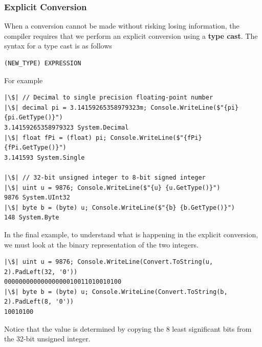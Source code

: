 \documentclass{article}
\begin{document}
\subsubsection{Explicit Conversion}
When a conversion cannot be made without risking losing information,
the compiler requires that we perform an explicit conversion using a
\textbf{type cast}. The syntax for a type cast is as follows
\begin{verbatim}
(NEW_TYPE) EXPRESSION
\end{verbatim}
For example
\begin{verbatim}
|\$| // Decimal to single precision floating-point number
|\$| decimal pi = 3.14159265358979323m; Console.WriteLine($"{pi} {pi.GetType()}")
3.14159265358979323 System.Decimal
|\$| float fPi = (float) pi; Console.WriteLine($"{fPi} {fPi.GetType()}")
3.141593 System.Single

|\$| // 32-bit unsigned integer to 8-bit signed integer
|\$| uint u = 9876; Console.WriteLine($"{u} {u.GetType()}")
9876 System.UInt32
|\$| byte b = (byte) u; Console.WriteLine($"{b} {b.GetType()}")
148 System.Byte
\end{verbatim}
In the final example, to understand what is happening in the explicit
conversion, we must look at the binary representation of the two
integers.
\begin{verbatim}
|\$| uint u = 9876; Console.WriteLine(Convert.ToString(u, 2).PadLeft(32, '0'))
00000000000000000010011010010100
|\$| byte b = (byte) u; Console.WriteLine(Convert.ToString(b, 2).PadLeft(8, '0'))
10010100
\end{verbatim}
Notice that the value is determined by copying the 8 least significant
bits from the 32-bit unsigned integer.
\end{document}
